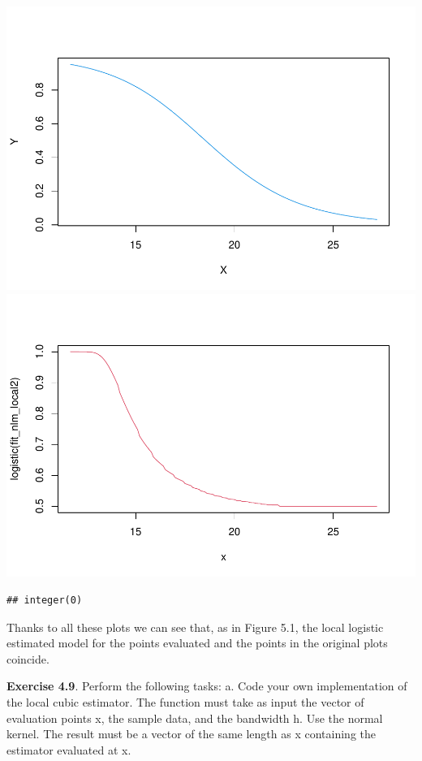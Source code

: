\documentclass[
]{article}
\begin{document}
\includegraphics{prueba_files/figure-latex/unnamed-chunk-8-1.pdf}
\includegraphics{prueba_files/figure-latex/unnamed-chunk-8-2.pdf}

\begin{verbatim}
## integer(0)
\end{verbatim}

Thanks to all these plots we can see that, as in Figure 5.1, the local
logistic estimated model for the points evaluated and the points in the
original plots coincide.

\textbf{Exercise 4.9}. Perform the following tasks: a. Code your own
implementation of the local cubic estimator. The function must take as
input the vector of evaluation points x, the sample data, and the
bandwidth h. Use the normal kernel. The result must be a vector of the
same length as x containing the estimator evaluated at x.
\end{document}
